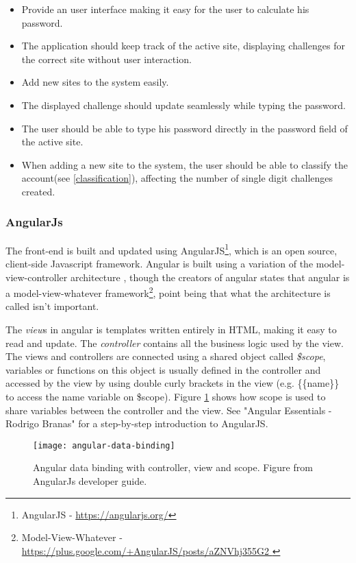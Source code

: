 \begin{itemize}
    \item Provide an user interface making it easy for the user to calculate his password.
    \item The application should keep track of the active site, displaying challenges for the correct site without user interaction.
    \item Add new sites to the system easily. 
    \item The displayed challenge should update seamlessly while typing the password.
    \item The user should be able to type his password directly in the password field of the active site.
    \item When adding a new site to the system, the user should be able to classify the account(see \autoref{classification}), affecting the number of single digit challenges created.
\end{itemize}


\subsubsection{AngularJs}
The front-end is built and updated using AngularJS\footnote{AngularJS - \url{https://angularjs.org/}}, which is an open source, client-side Javascript framework. Angular is built using a variation of the model-view-controller architecture \cite{mvc}, though the creators of angular states that angular is a model-view-whatever framework\footnote{Model-View-Whatever - \url{ https://plus.google.com/+AngularJS/posts/aZNVhj355G2 }}, point being that what the architecture is called isn't important. 
\par The \emph{view}s in angular is templates written entirely in HTML, making it easy to read and update. The \emph{controller} contains all the business logic used by the view. The views and controllers are connected using a shared object called \emph{\$scope}, variables or functions on this object is usually defined in the controller and accessed by the view by using double curly brackets in the view (e.g. \{\{name\}\} to access the name variable on \$scope). Figure \ref{angular-data-binding} shows how scope is used to share variables between the controller and the view. 
See "Angular Essentials - Rodrigo Branas"\cite{angularjs-book} for a step-by-step introduction to AngularJS.

\begin{figure}[ht]
    \texttt{[image: angular-data-binding]} 
    \caption{Angular data binding with controller, view and scope. Figure from AngularJs developer guide.}
    \label{angular-data-binding}
\end{figure}


